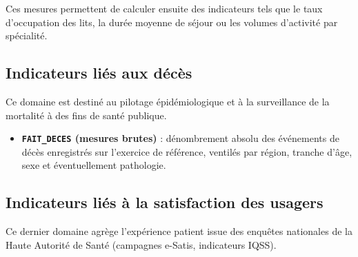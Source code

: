 \documentclass[12pt, a4paper]{report}
\newcommand{\code}[1]{\texttt{#1}}
\begin{document}
Ces mesures permettent de calculer ensuite des indicateurs tels que le taux d’occupation des lits, la durée moyenne de séjour ou les volumes d’activité par spécialité.

\subsection{Indicateurs liés aux décès}

Ce domaine est destiné au pilotage épidémiologique et à la surveillance de la mortalité à des fins de santé publique.

\begin{itemize}[label=\textcolor{chuBlue}{\textbullet}]
  \item \textbf{\code{FAIT\_DECES} (mesures brutes)} :  
  dénombrement absolu des événements de décès enregistrés sur l’exercice de référence, ventilés par région, tranche d’âge, sexe et éventuellement pathologie. 
\end{itemize}

\subsection{Indicateurs liés à la satisfaction des usagers}

Ce dernier domaine agrège l’expérience patient issue des enquêtes nationales de la Haute Autorité de Santé (campagnes e-Satis, indicateurs IQSS).
\end{document}
